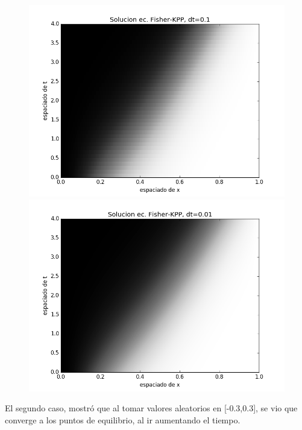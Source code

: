\documentclass[10pt]{article}
\begin{document}
\begin{figure}[H]
\centering
\includegraphics[scale=0.4]{imgp1_01.png}
\includegraphics[scale=0.4]{figure_1_001.png}
\end{figure}

El segundo caso, mostró que al tomar valores aleatorios en [-0.3,0.3], se vio que converge a los puntos de equilibrio, al ir aumentando el tiempo. 
\end{document}
